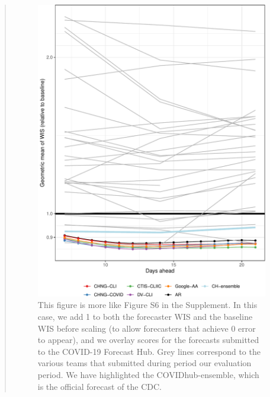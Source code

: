 \documentclass[11pt]{article}
\newenvironment{resp}{\begin{quote}\color{cobalt}}{\end{quote}}
\begin{document}
\begin{resp}
  \begin{figure}[tb]
    \centering
    \includegraphics[width=.9\textwidth]{fig/compare-to-hub-geomean-1.pdf}
    \caption{This figure is more like Figure S6 in the Supplement. In this case,
      we add 1 to both the forecaster WIS and the baseline WIS before scaling
      (to allow forecasters that achieve 0 error to appear), and we overlay
      scores for the forecasts submitted to the COVID-19 Forecast Hub. Grey
      lines correspond to the various teams that submitted during period our
      evaluation period. We have highlighted the COVIDhub-ensemble, which is the
      official forecast of the CDC.}
    \label{fig:compare-to-hub-geomean}
  \end{figure}
\end{resp}
\end{document}
